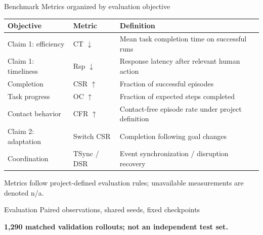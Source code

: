 \documentclass[11pt]{beamer}
\newcommand{\keyidea}[1]{\vspace{0.12cm}\begin{center}\small\color{HN}\bfseries #1\end{center}}
\begin{document}
\begin{frame}{Benchmark \hfill Metrics organized by evaluation objective}
\centering\scriptsize
\renewcommand{\arraystretch}{1.46}
\begin{tabular}{p{2.05cm}p{1.31cm}p{4.86cm}}
\toprule
\textbf{Objective} & \textbf{Metric} & \textbf{Definition}\\
\midrule
Claim 1: efficiency & CT $\downarrow$ & Mean task completion time on successful runs\\
Claim 1: timeliness & Rsp $\downarrow$ & Response latency after relevant human action\\
Completion & CSR $\uparrow$ & Fraction of successful episodes\\
Task progress & OC $\uparrow$ & Fraction of expected steps completed\\
Contact behavior & CFR $\uparrow$ & Contact-free episode rate under project definition\\
\midrule
Claim 2: adaptation & Switch CSR & Completion following goal changes\\
Coordination & TSync / DSR & Event synchronization / disruption recovery\\
\bottomrule
\end{tabular}
\begin{center}\scriptsize
Metrics follow project-defined evaluation rules; unavailable measurements are denoted n/a.
\end{center}
\end{frame}

\begin{frame}{Evaluation \hfill Paired observations, shared seeds, fixed checkpoints}
\centering
{}
\keyidea{1,290 matched validation rollouts; not an independent test set.}

\end{frame}
\end{document}
